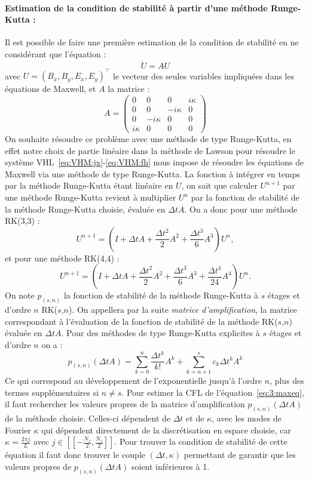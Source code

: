 \paragraph{Estimation de la condition de stabilité à partir d'une méthode Runge-Kutta :\\}
Il est possible de faire une première estimation de la condition de stabilité en ne considérant que l'équation :
\begin{equation}\label{eq:3:maxeq}
  \dot{U} = A U
\end{equation}
avec $U = (B_x,B_y,E_x,E_y)^\top$ le vecteur des seules variables impliquées dans les équations de Maxwell, et $A$ la matrice :
$$
  A = \begin{pmatrix}
    0       &  0       &  0       & i\kappa \\
    0       &  0       & -i\kappa & 0       \\
    0       & -i\kappa &  0       & 0       \\
    i\kappa &  0       &  0       & 0 
  \end{pmatrix}
$$
On souhaite résoudre ce problème avec une méthode de type Runge-Kutta, en effet notre choix de partie linéaire dans la méthode de Lawson pour résoudre le système VHL~\eqref{eq:VHM:jx}-\eqref{eq:VHM:fh} nous impose de résoudre les équations de Maxwell via une méthode de type Runge-Kutta. La fonction à intégrer en temps par la méthode Runge-Kutta étant linéaire en $U$, on sait que calculer $U^{n+1}$ par une méthode Runge-Kutta revient à multiplier $U^n$ par la fonction de stabilité de la méthode Runge-Kutta choisie, évaluée en $\Delta tA$. On a donc pour une méthode RK(3,3) :
$$
  U^{n+1} = \left(I + \Delta t A + \frac{\Delta t^2}{2}A^2 + \frac{\Delta t^3}{6}A^3 \right)U^n,
$$
et pour une méthode RK(4,4) :
$$
  U^{n+1} = \left(I + \Delta t A + \frac{\Delta t^2}{2}A^2 + \frac{\Delta t^3}{6}A^3 + \frac{\Delta t^4}{24}A^4 \right)U^n.
$$
On note $p_{(s,n)}$ la fonction de stabilité de la méthode Runge-Kutta à $s$ étages et d'ordre $n$ RK($s$,$n$). On appellera par la suite \emph{matrice d'amplification}, la matrice correspondant à l'évaluation de la fonction de stabilité de la méthode RK($s$,$n$) évaluée en $\Delta t A$. Pour des méthodes de type Runge-Kutta explicites à $s$ étages et d'ordre $n$ on a :
$$
  p_{(s,n)}(\Delta t A) = \sum_{k=0}^n \frac{\Delta t^k}{k!}A^k + \sum_{k=n+1}^s c_k\Delta t^kA^k
$$
Ce qui correspond au développement de l'exponentielle jusqu'à l'ordre $n$, plus des termes supplémentaires si $n\neq s$. Pour estimer la CFL de l'équation~\eqref{eq:3:maxeq}, il faut rechercher les valeurs propres de la matrice d'amplification $p_{(s,n)}(\Delta t A)$ de la méthode choisie. Celles-ci dépendent de $\Delta t$ et de $\kappa$, avec les modes de Fourier $\kappa$ qui dépendent directement de la discrétisation en espace choisie, car $\kappa=\frac{2\pi j}{L}$ avec $j \in[\![-\frac{N_z}{2},\frac{N_z}{2} ]\!]$. Pour trouver la condition de stabilité de cette équation il faut donc trouver le couple $(\Delta t,\kappa)$ permettant de garantir que les valeurs propres de $p_{(s,n)}(\Delta t A)$ soient inférieures à 1.

